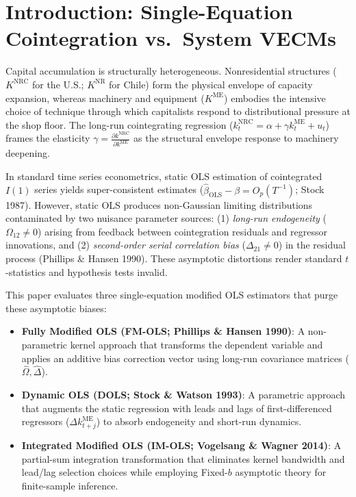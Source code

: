 \documentclass[11pt,a4paper]{article}
\begin{document}
\FloatBarrier
\section{Introduction: Single-Equation Cointegration vs.\ System VECMs}

Capital accumulation is structurally heterogeneous. Nonresidential structures ($K^{\text{NRC}}$ for the U.S.; $K^{\text{NR}}$ for Chile) form the physical envelope of capacity expansion, whereas machinery and equipment ($K^{\text{ME}}$) embodies the intensive choice of technique through which capitalists respond to distributional pressure at the shop floor. The long-run cointegrating regression ($k_t^{\text{NRC}} = \alpha + \gamma k_t^{\text{ME}} + u_t$) frames the elasticity $\gamma = \frac{\partial k^{\text{NRC}}}{\partial k^{\text{ME}}}$ as the structural envelope response to machinery deepening.

In standard time series econometrics, static OLS estimation of cointegrated $I(1)$ series yields super-consistent estimates ($\hat{\beta}_{\text{OLS}} - \beta = O_p(T^{-1})$; Stock 1987). However, static OLS produces non-Gaussian limiting distributions contaminated by two nuisance parameter sources: (1) \textit{long-run endogeneity} ($\Omega_{12} \neq 0$) arising from feedback between cointegration residuals and regressor innovations, and (2) \textit{second-order serial correlation bias} ($\Delta_{21} \neq 0$) in the residual process (Phillips \& Hansen 1990). These asymptotic distortions render standard $t$-statistics and hypothesis tests invalid.

This paper evaluates three single-equation modified OLS estimators that purge these asymptotic biases:
\begin{itemize}
    \item \textbf{Fully Modified OLS (FM-OLS; Phillips \& Hansen 1990)}: A non-parametric kernel approach that transforms the dependent variable and applies an additive bias correction vector using long-run covariance matrices ($\hat{\Omega}, \hat{\Delta}$).
    \item \textbf{Dynamic OLS (DOLS; Stock \& Watson 1993)}: A parametric approach that augments the static regression with leads and lags of first-differenced regressors ($\Delta k_{t+j}^{\text{ME}}$) to absorb endogeneity and short-run dynamics.
    \item \textbf{Integrated Modified OLS (IM-OLS; Vogelsang \& Wagner 2014)}: A partial-sum integration transformation that eliminates kernel bandwidth and lead/lag selection choices while employing Fixed-$b$ asymptotic theory for finite-sample inference.
\end{itemize}
\end{document}
